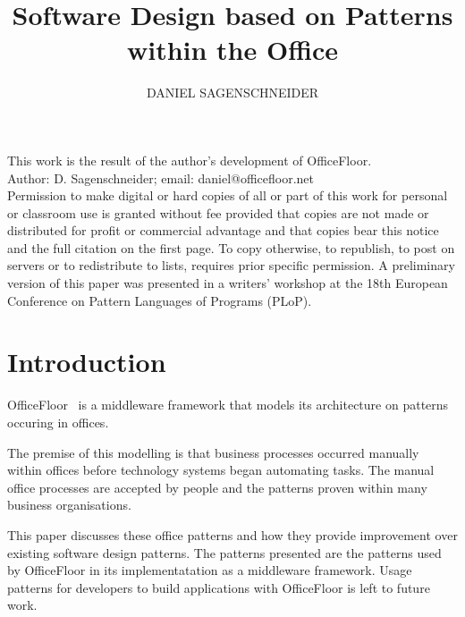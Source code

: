 \documentclass[prodmode]{style/acmlarge}
\title{Software Design based on Patterns within the Office}
\author{DANIEL SAGENSCHNEIDER \affil{OfficeFloor, daniel@officefloor.net}}
\begin{document}
\graphicspath{{./pdf/}}

\lstset{language=Java}

\captionsetup[lstlisting]{font=footnotesize}


\begin{bottomstuff}
This work is the result of the author's development of OfficeFloor.\\
Author: D. Sagenschneider; email: daniel@officefloor.net\\

Permission to make digital or hard copies of all or part of this work for
personal or classroom use is granted without fee provided that copies are not
made or distributed for profit or commercial advantage and that copies bear this
notice and the full citation on the first page. To copy otherwise, to republish,
to post on servers or to redistribute to lists, requires prior specific
permission. A preliminary version of this paper was presented in a writers'
workshop at the 18th European Conference on Pattern Languages of Programs
(PLoP).
\end{bottomstuff}

\maketitle




\section{Introduction}

OfficeFloor~\cite{officefloor} is a middleware framework that models its
architecture on patterns occuring in offices.

The premise of this modelling is that business processes occurred manually
within offices before technology systems began automating tasks.  The manual
office processes are accepted by people and the patterns proven within many
business organisations.

This paper discusses these office patterns and how they provide improvement over
existing software design patterns.  The patterns presented are the patterns used
by OfficeFloor in its implementatation as a middleware framework.
Usage patterns for developers to build applications with OfficeFloor is left to
future work.
\end{document}
